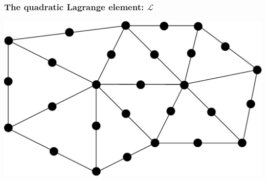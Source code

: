 \begin{frame}
  \frametitle{The quadratic Lagrange element: $\mathcal{L}$}

  \begin{center}
    \includegraphics[width=\textwidth]{pdf/mesh-p2.pdf}
  \end{center}

\end{frame}
